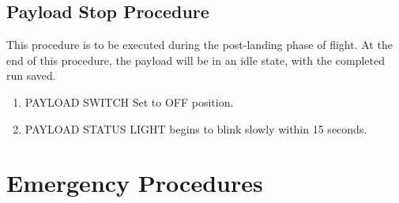 \documentclass{report}
\begin{document}
	\section{Payload Stop Procedure}
		This procedure is to be executed during the post-landing phase of flight.  At the end of this procedure, the payload will be in an idle state, with the completed run saved.
		\begin{enumerate}
			\item PAYLOAD SWITCH \hrulefill Set to OFF position.
			\item PAYLOAD STATUS LIGHT \hrulefill begins to blink slowly within 15 seconds.
		\end{enumerate}
\chapter{Emergency Procedures}
\end{document}
